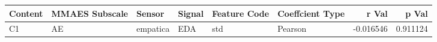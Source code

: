 \begin{tabular}{llllllrr}
\toprule
Content & MMAES Subscale &   Sensor & Signal & Feature Code & Coeffcient Type &     r Val &    p Val \\
\midrule
     C1 &             AE & empatica &    EDA &          std &         Pearson & -0.016546 & 0.911124 \\
\bottomrule
\end{tabular}
